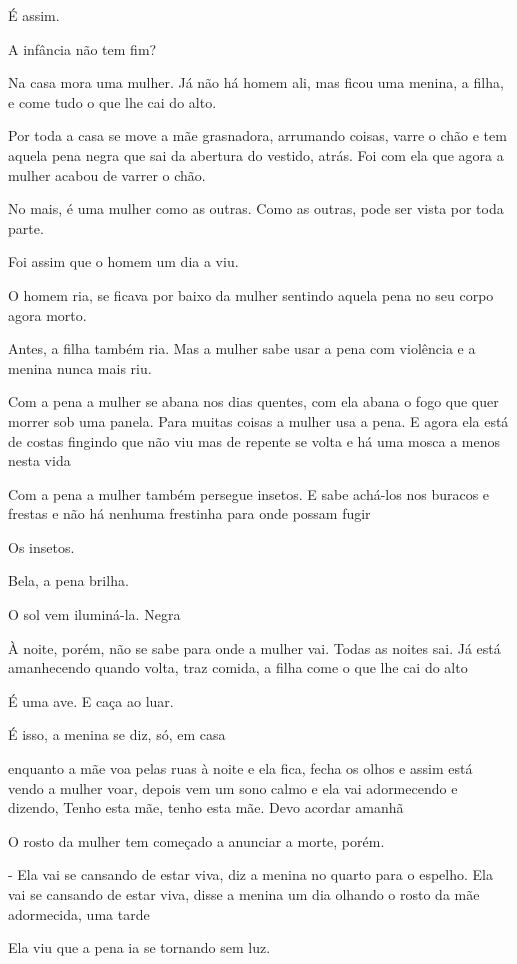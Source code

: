 É assim.

A infância não tem fim?

Na casa mora uma mulher. Já não há homem ali, mas ficou uma menina, a
filha, e come tudo o que lhe cai do alto.

Por toda a casa se move a mãe grasnadora, arrumando coisas, varre o chão
e tem aquela pena negra que sai da abertura do vestido, atrás. Foi com
ela que agora a mulher acabou de varrer o chão.

No mais, é uma mulher como as outras. Como as outras, pode ser vista por
toda parte.

Foi assim que o homem um dia a viu.

O homem ria, se ficava por baixo da mulher sentindo aquela pena no seu
corpo agora morto.

Antes, a filha também ria. Mas a mulher sabe usar a pena com violência e
a menina nunca mais riu.

Com a pena a mulher se abana nos dias quentes, com ela abana o fogo que
quer morrer sob uma panela. Para muitas coisas a mulher usa a pena. E
agora ela está de costas fingindo que não viu mas de repente se volta e
há uma mosca a menos nesta vida

Com a pena a mulher também persegue insetos. E sabe achá-los nos buracos
e frestas e não há nenhuma frestinha para onde possam fugir

Os insetos.

Bela, a pena brilha.

O sol vem iluminá-la. Negra

À noite, porém, não se sabe para onde a mulher vai. Todas as noites sai.
Já está amanhecendo quando volta, traz comida, a filha come o que lhe
cai do alto

É uma ave. E caça ao luar.

É isso, a menina se diz, só, em casa

enquanto a mãe voa pelas ruas à noite e ela fica, fecha os olhos e assim
está vendo a mulher voar, depois vem um sono calmo e ela vai adormecendo
e dizendo, Tenho esta mãe, tenho esta mãe. Devo acordar amanhã

O rosto da mulher tem começado a anunciar a morte, porém.

- Ela vai se cansando de estar viva, diz a menina no quarto para o
espelho. Ela vai se cansando de estar viva, disse a menina um dia
olhando o rosto da mãe adormecida, uma tarde

Ela viu que a pena ia se tornando sem luz.

